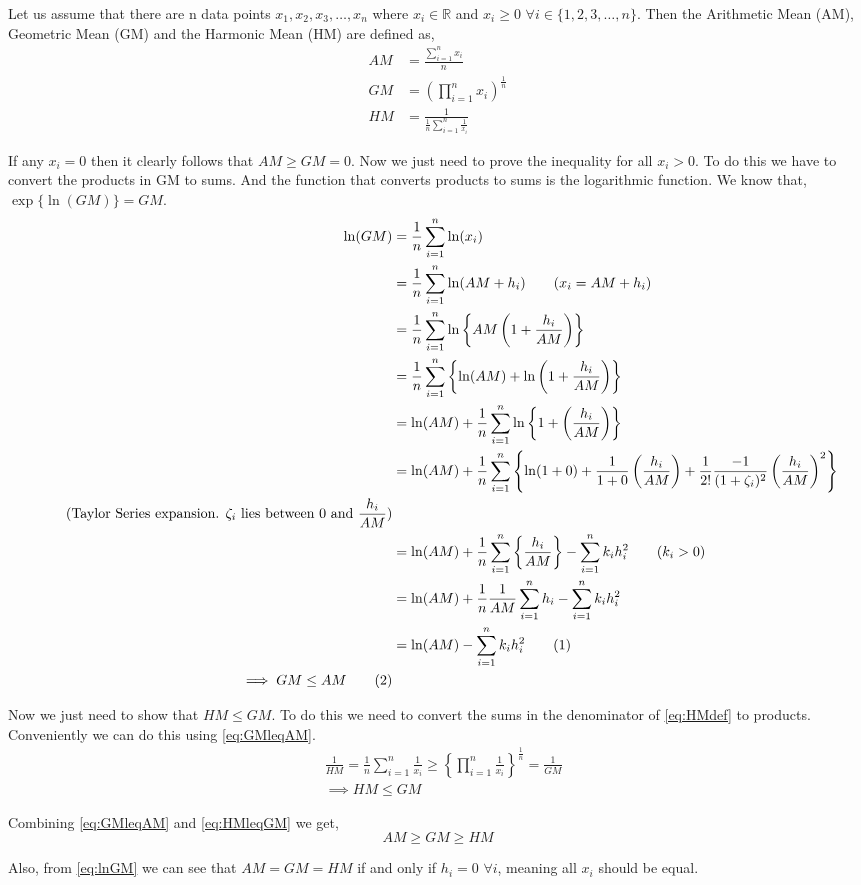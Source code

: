 \documentclass[a4paper, 10pt]{article}
\newcommand\numberthis{\addtocounter{equation}{1}\tag{\theequation}}
\newcommand{\Sum}[1]{\sum \limits_{i = 1}^{n} {#1}}
\newcommand{\Prod}[1]{\prod \limits_{i = 1}^{n} {#1}}
\newcommand{\inv}[1]{\frac{1}{#1}}
\begin{document}
Let us assume that there are n data points $x_1, x_2, x_3, \dots, x_n$ where $x_i \in \mathbb{R}$ and $x_i \geq 0$ $\forall i \in \{ 1, 2, 3, \dots, n \}$. Then the Arithmetic Mean (AM), Geometric Mean (GM) and the Harmonic Mean (HM) are defined as,
\begin{align}
	AM &= \frac{\Sum{x_i}}{n} \label{eq:AMdef} \\
	GM &= {\left( \Prod{x_i} \right)}^{\inv{n}} \label{eq:GMdef} \\
	HM &= \inv{\inv{n} \Sum{\inv{x_i}}} \label{eq:HMdef}
\end{align}

If any $x_i = 0$ then it clearly follows that $AM \geq GM = 0$. Now we just need to prove the inequality for all $x_i > 0$. To do this we have to convert the products in GM to sums. And the function that converts products to sums is the logarithmic function. We know that, $\exp\{\ln(GM)\} = GM$.
\begin{align*}
	\ln(GM) &= \inv{n} \Sum{\ln(x_i)} \\
			&= \inv{n} \Sum{\ln(AM + h_i)} \tag{$x_i = AM + h_i$} \\
			&= \inv{n} \Sum{\ln \left\{ AM \left( 1 + \frac{h_i}{AM} \right) \right\}} \\
			&= \inv{n} \Sum{\left\{\ln(AM) + \ln \left( 1 + \frac{h_i}{AM} \right) \right\}} \\
			&= \ln(AM) + \inv{n} \Sum{\ln \left\{ 1 + \left( \frac{h_i}{AM} \right) \right\}} \\
			&= \ln(AM) + \inv{n} \Sum{\left\{ \ln(1 + 0) + \inv{1 + 0} \left( \frac{h_i}{AM} \right) + \inv{2!} \frac{-1}{(1 + \zeta_i)^2} \left( \frac{h_i}{AM} \right)^2 \right\}} \\
			\tag{Taylor Series expansion. $\zeta_i$ lies between 0 and $\dfrac{h_i}{AM}$}\\
			&= \ln(AM) + \inv{n} \Sum{\left\{ \frac{h_i}{AM} \right\}} - \Sum k_i h_i^2 \tag{$k_i > 0$} \\
			&= \ln(AM) + \inv{n} \inv{AM} \Sum{h_i} - \Sum{k_i h_i^2} \\
			&= \ln(AM) - \Sum{k_i h_i^2} \numberthis \label{eq:lnGM} \\
	\implies GM \leq AM \numberthis \label{eq:GMleqAM}
\end{align*}

\noindent Now we just need to show that $HM \leq GM$. To do this we need to convert the sums in the denominator of \eqref{eq:HMdef} to products. Conveniently we can do this using \eqref{eq:GMleqAM}.
\begin{align}
	&\inv{HM} = \inv{n} \Sum{\inv{x_i}} \geq { \left\{ \Prod{\inv{x_i}} \right\} }^{\inv{n}} = \inv{GM} \nonumber\\
	&\implies HM \leq GM \label{eq:HMleqGM}
\end{align}

\noindent Combining \eqref{eq:GMleqAM} and \eqref{eq:HMleqGM} we get,
\[ AM \geq GM \geq HM \]

Also, from \eqref{eq:lnGM} we can see that $AM = GM = HM$ if and only if $h_i = 0$ $\forall i$, meaning all $x_i$ should be equal.
\end{document}
